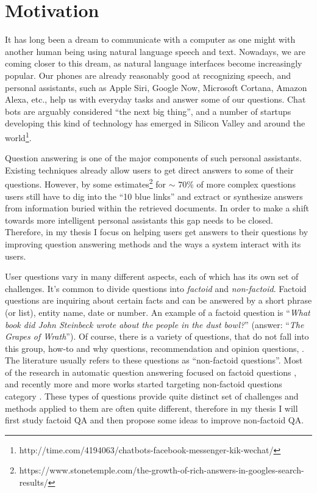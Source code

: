 %
%
\label{chapter:intro}

\setcounter{page}{1}
\pagestyle{myheadings}


\newtheorem{definition}{Definition}
\newtheorem{proposition}{Proposition}


\section{Motivation}

It has long been a dream to communicate with a computer as one might with another human being using natural language speech and text.
Nowadays, we are coming closer to this dream, as natural language interfaces become increasingly popular.
Our phones are already reasonably good at recognizing speech, and personal assistants, such as Apple Siri, Google Now, Microsoft Cortana, Amazon Alexa, etc., help us with everyday tasks and answer some of our questions.
Chat bots are arguably considered ``the next big thing'', and a number of startups developing this kind of technology has emerged in Silicon Valley and around the world\footnote{http://time.com/4194063/chatbots-facebook-messenger-kik-wechat/}.

Question answering is one of the major components of such personal assistants.
Existing techniques already allow users to get direct answers to some of their questions.
However, by some estimates\footnote{https://www.stonetemple.com/the-growth-of-rich-answers-in-googles-search-results/} for $\sim$ 70\% of more complex questions users still have to dig into the ``10 blue links'' and extract or synthesize answers from information buried within the retrieved documents.
In order to make a shift towards more intelligent personal assistants this gap needs to be closed.
Therefore, in my thesis I focus on helping users get answers to their questions by improving question answering methods and the ways a system interact with its users.

User questions vary in many different aspects, each of which has its own set of challenges.
It's common to divide questions into \textit{factoid} and \textit{non-factoid}.
Factoid questions are inquiring about certain facts and can be answered by a short phrase (or list), \ie entity name, date or number.
An example of a factoid question is ``\textit{What book did John Steinbeck wrote about the people in the dust bowl?}'' (answer: ``\textit{The Grapes of Wrath}'').
Of course, there is a variety of questions, that do not fall into this group, \eg how-to and why questions, recommendation and opinion questions, \etc.
The literature usually refers to these questions as ``non-factoid questions''.
Most of the research in automatic question answering focused on factoid questions \cite{voorhees2001trec}, and recently more and more works started targeting non-factoid questions category \cite{overviewliveqa15}.
These types of questions provide quite distinct set of challenges and methods applied to them are often quite different, therefore in my thesis I will first study factoid QA and then propose some ideas to improve non-factoid QA.

